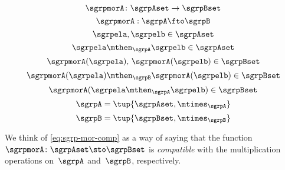 \begin{forslides}
    \begin{equation}\label{eq:semigroup-mor-func}
    \sgrpmorA\colon \sgrpAset \to \sgrpBset
    \end{equation}
    \begin{equation}\label{eq:semigroup-mor-mor}
    \sgrpmorA: \sgrpA \fto \sgrpB
    \end{equation}
    \begin{equation}\label{eq:sgrslides_xy}
    \sgrpela, \sgrpelb \in \sgrpAset
    \end{equation}
    \begin{equation}\label{eq:sgrslides_xty}
    \sgrpela \mthen_\sgrpA \sgrpelb \in \sgrpAset
    \end{equation}
    \begin{equation}\label{eq:sgrslides_fxfy}
    \sgrpmorA(\sgrpela),\, \sgrpmorA( \sgrpelb) \in \sgrpBset
    \end{equation}
    \begin{equation}\label{eq:sgrslides_fxtfy}
    \sgrpmorA(\sgrpela) \mthen_\sgrpB \sgrpmorA(\sgrpelb) \in \sgrpBset
    \end{equation}
    \begin{equation}\label{eq:sgrslides_fxty}
    \sgrpmorA(\sgrpela  \mthen_\sgrpA  \sgrpelb) \in \sgrpBset
    \end{equation}
    \begin{equation}\label{eq:sgrpA}
    \sgrpA = \tup{\sgrpAset, \mtimes_\sgrpA}
    \end{equation}
    \begin{equation}\label{eq:sgrpB}
    \sgrpB = \tup{\sgrpBset, \mtimes_\sgrpB}
    \end{equation}
\end{forslides}
We think of   \cref{eq:sgrp-mor-comp} as a way of saying that the function~$\sgrpmorA\colon \sgrpAset \sto \sgrpBset$  is \emph{compatible} with the multiplication operations on~$\sgrpA$ and~$\sgrpB$, respectively.

